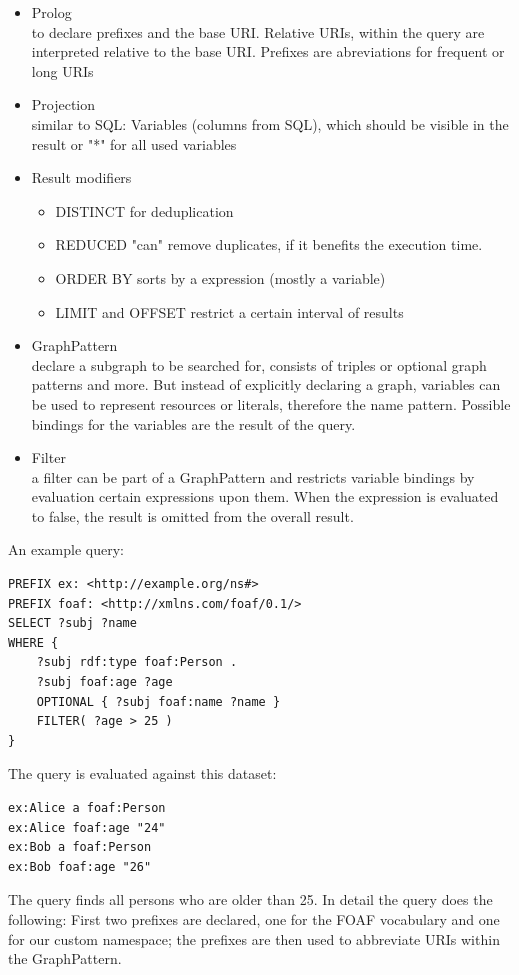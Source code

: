\begin{itemize}
	\item{Prolog\\to declare prefixes and the base URI. 
	Relative URIs, within the query are interpreted relative to the base URI. 
	Prefixes are abreviations for frequent or long URIs} 
	\item{Projection\\similar to SQL: Variables (columns from SQL), which should be visible in the result or "*" for all used variables}
	\item{Result modifiers
	\begin{itemize}
		\item{DISTINCT for deduplication} 
		\item{REDUCED "can" remove duplicates, if it benefits the execution time.}
		\item{ORDER BY sorts by a expression (mostly a variable)}
		\item{LIMIT and OFFSET restrict a certain interval of results}
	\end{itemize}
	}
	\item{GraphPattern\\
	declare a subgraph to be searched for, consists of triples or optional graph patterns and more. But instead of explicitly declaring a graph, variables can be used to represent resources or literals, therefore the name pattern. 
	Possible bindings for the variables are the result of the query.
	}
	\item{Filter\\
	a filter can be part of a GraphPattern and restricts variable bindings by evaluation certain expressions upon them. When the expression is evaluated to false, the result is omitted from the overall result.
	}
\end{itemize}
An example query:
\begin{lstlisting}[style=sparql]
PREFIX ex: <http://example.org/ns#>
PREFIX foaf: <http://xmlns.com/foaf/0.1/>
SELECT ?subj ?name
WHERE {
    ?subj rdf:type foaf:Person .
    ?subj foaf:age ?age
    OPTIONAL { ?subj foaf:name ?name }
    FILTER( ?age > 25 )
}
\end{lstlisting}
The query is evaluated against this dataset:
\begin{lstlisting}[style=N3]
ex:Alice a foaf:Person
ex:Alice foaf:age "24"
ex:Bob a foaf:Person
ex:Bob foaf:age "26"
\end{lstlisting}
The query finds all persons who are older than 25. In detail the query does the following: First two prefixes are declared, one for the FOAF vocabulary and one for our custom namespace; the prefixes are then used to abbreviate URIs within the GraphPattern. 
